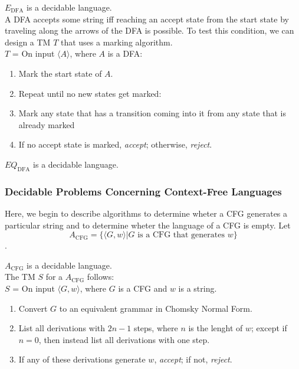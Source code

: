 \documentclass{article}
\begin{document}
\begin{theorem}
  $E_{\textrm{DFA}}$ is a decidable language. \\ 
  
  A DFA accepts some string iff reaching an accept state from the start state by traveling along the arrows of the DFA is possible. To test this condition, we can design a TM $T$ that uses a marking algorithm. \\ 
  $T$ = On input $\langle A \rangle$, where $A$ is a DFA: 
  \begin{enumerate}
    \item Mark the start state of $A$. 
    \item Repeat until no new states get marked: 
    \item \indent Mark any state that has a transition coming into it from any state that is already marked 
    \item If no accept state is marked, \emph{accept}; otherwise, \emph{reject}. 
  \end{enumerate}
\end{theorem}

\begin{theorem}
  $EQ_{\textrm{DFA}}$ is a decidable language. 
\end{theorem}

\subsubsection{Decidable Problems Concerning Context-Free Languages}

Here, we begin to describe algorithms to determine wheter a CFG generates a particular string and to determine wheter the language of a CFG is empty. Let $$A_{\textrm{CFG}} = \{\langle G,w \rangle | G \textrm{ is a CFG that generates } w\}$$. 

\begin{theorem}
  $A_{\textrm{CFG}}$ is a decidable language. \\ 

  The TM $S$ for a $A_{\textrm{CFG}}$ follows: \\ 
  $S$ = On input $\langle G,w \rangle$, where $G$ is a CFG and $w$ is a string.  
  \begin{enumerate}
    \item Convert $G$ to an equivalent grammar in Chomsky Normal Form. 
    \item List all derivations with $2n-1$ steps, where $n$ is the lenght of $w$; except if $n=0$, then instead list all derivations with one step. 
    \item If any of these derivations generate $w$, \emph{accept}; if not, \emph{reject}. 
  \end{enumerate}
\end{theorem}
\end{document}
